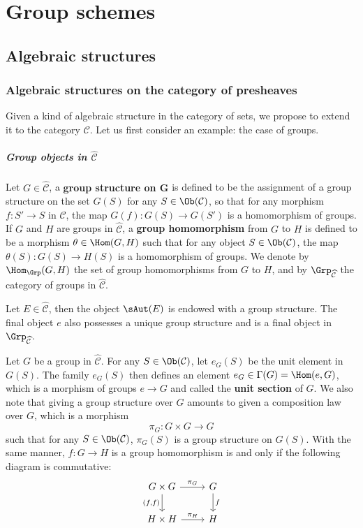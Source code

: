 \chapter{Group schemes}
\section{Algebraic structures}
\subsection{Algebraic structures on the category of presheaves}
Given a kind of algebraic structure in the category of sets, we propose to extend it to the category $\mathcal{C}$. Let us first consider an example: the case of groups.
\paragraph{Group objects in \texorpdfstring{$\widehat{\mathcal{C}}$}{C}}
Let $G\in\widehat{\mathcal{C}}$, a \textbf{group structure on $\bm{G}$} is defined to be the assignment of a group structure on the set $G(S)$ for any $S\in\Ob(\mathcal{C})$, so that for any morphism $f:S'\to S$ in $\mathcal{C}$, the map $G(f):G(S)\to G(S')$ is a homomorphism of groups. If $G$ and $H$ are groups in $\widehat{\mathcal{C}}$, a \textbf{group homomorphism} from $G$ to $H$ is defined to be a morphism $\theta\in\Hom(G,H)$ such that for any object $S\in\Ob(\mathcal{C})$, the map $\theta(S):G(S)\to H(S)$ is a homomorphism of groups. We denote by $\Hom_{\Grp}(G,H)$ the set of group homomorphisms from $G$ to $H$, and by $\Grp_{\widehat{\mathcal{C}}}$ the category of groups in $\widehat{\mathcal{C}}$.

\begin{example}
Let $E\in\widehat{\mathcal{C}}$, then the object $\sAut(E)$ is endowed with a group structure. The final object $e$ also possesses a unique group structure and is a final object in $\Grp_{\widehat{\mathcal{C}}}$.
\end{example}

Let $G$ be a group in $\widehat{\mathcal{C}}$. For any $S\in\Ob(\mathcal{C})$, let $e_G(S)$ be the unit element in $G(S)$. The family $e_G(S)$ then defines an element $e_G\in\Gamma(G)=\Hom(e,G)$, which is a morphism of groups $e\to G$ and called the \textbf{unit section} of $G$. We also note that giving a group structure over $G$ amounts to given a composition law over $G$, which is a morphism
\[\pi_G:G\times G\to G\]
such that for any $S\in\Ob(\mathcal{C})$, $\pi_G(S)$ is a group structure on $G(S)$. With the same manner, $f:G\to H$ is a group homomorphism is and only if the following diagram is commutative:
\[\begin{tikzcd}
G\times G\ar[r,"\pi_G"]\ar[d,swap,"{(f,f)}"]&G\ar[d,"f"]\\
H\times H\ar[r,"\pi_H"]&H
\end{tikzcd}\]

